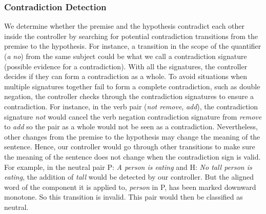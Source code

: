 \documentclass[11pt,a4paper]{article}
\begin{document}
\subsubsection{Contradiction Detection}
We determine whether the premise and the hypothesis contradict each other inside the controller by searching for potential contradiction transitions from the premise to the hypothesis. For instance, a transition in the scope of
the quantifier (\textit{a}  \textit{no}) from the same subject could be what we call a contradiction signature
(possible evidence for a contradiction). With all the signatures, the controller decides if they can form a contradiction as a whole. To avoid situations when multiple signatures together fail to form a complete contradiction, such as double negation, the controller checks through the contradiction signatures to ensure a contradiction. For instance, in the verb pair (\textit{not remove}, {\textit{add}}), the contradiction signature \textit{not} would cancel the verb negation contradiction signature from \textit{remove} to \textit{add} so the pair as a whole would not be seen as a contradiction. Nevertheless, other changes from the premise to the hypothesis may change the meaning of the sentence. Hence, our controller would go through other transitions to make sure the meaning of the sentence does not change when the contradiction sign is valid. For example, in the neutral pair P: \textit{A person is eating} and H: \textit{No tall person is eating}, the addition of \textit{tall} would be detected by our controller.
But the aligned word of the component it is applied to, \textit{person} in P, 
has been marked downward monotone.  So this transition is invalid. This pair would then be classified as neutral.
\end{document}
